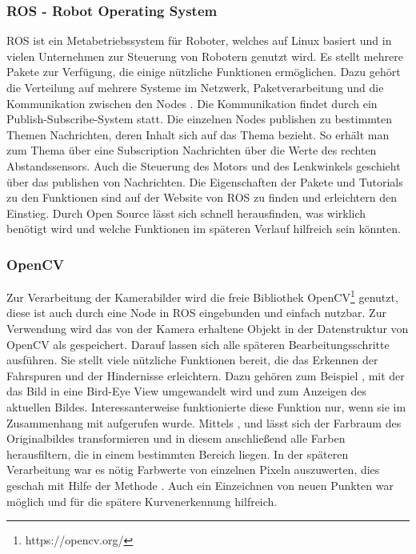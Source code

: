 \subsubsection{ROS - Robot Operating System}
\label{sec:ros}
ROS ist ein Metabetriebssystem für Roboter, welches auf Linux basiert und in vielen Unternehmen zur Steuerung von Robotern genutzt wird. Es stellt mehrere Pakete zur Verfügung, die einige nützliche Funktionen ermöglichen. Dazu gehört die Verteilung auf mehrere Systeme im Netzwerk, Paketverarbeitung und die Kommunikation zwischen den Nodes \cite{einfuehrungROS}.
Die Kommunikation findet durch ein Publish-Subscribe-System statt. Die einzelnen Nodes publishen zu  bestimmten Themen Nachrichten, deren Inhalt sich auf das Thema bezieht. So erhält man zum Thema  über eine Subscription Nachrichten über die Werte des rechten Abstandssensors. Auch die Steuerung des Motors und des Lenkwinkels geschieht über das publishen von Nachrichten. 
Die Eigenschaften der Pakete und Tutorials zu den Funktionen sind auf der Website von ROS zu finden und erleichtern den Einstieg. Durch Open Source lässt sich schnell herausfinden, was wirklich benötigt wird und welche Funktionen im späteren Verlauf hilfreich sein könnten.

\subsubsection{OpenCV}
\label{sec:openCV}
Zur Verarbeitung der Kamerabilder wird die freie Bibliothek OpenCV\footnote{https://opencv.org/} genutzt, diese ist auch durch eine Node in ROS eingebunden und einfach nutzbar. Zur Verwendung wird das von der Kamera erhaltene Objekt in der Datenstruktur von OpenCV als  gespeichert. Darauf lassen sich alle späteren Bearbeitungsschritte ausführen. 
Sie stellt viele nützliche Funktionen bereit, die das Erkennen der Fahrspuren und der Hindernisse erleichtern. Dazu gehören zum Beispiel , mit der das Bild in eine Bird-Eye View umgewandelt wird und  zum Anzeigen des aktuellen Bildes. Interessanterweise funktionierte diese Funktion nur, wenn sie im Zusammenhang mit  aufgerufen wurde. 
Mittels ,  und  lässt sich der Farbraum des Originalbildes transformieren und in diesem anschließend alle Farben herausfiltern, die in einem bestimmten Bereich liegen. 
In der späteren Verarbeitung war es nötig Farbwerte von einzelnen Pixeln auszuwerten, dies geschah mit Hilfe der Methode . Auch ein Einzeichnen von neuen Punkten war möglich und für die spätere Kurvenerkennung hilfreich. 

